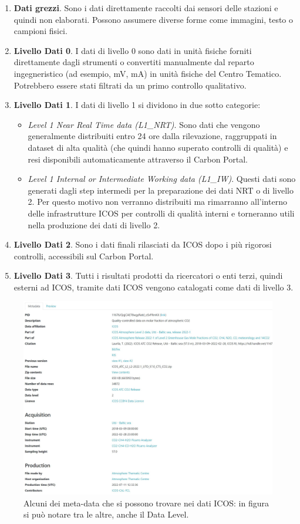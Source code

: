 \begin{enumerate}
    \item \textbf{Dati grezzi}. Sono i dati direttamente raccolti dai sensori delle stazioni e quindi non elaborati. Possono assumere diverse forme come immagini, testo o campioni fisici.
    \item \textbf{Livello Dati 0}. I dati di livello 0
    sono dati in unità fisiche forniti direttamente dagli
    strumenti o convertiti manualmente dal reparto
    ingegneristico (ad esempio, mV, mA) in unità fisiche
    del Centro Tematico. Potrebbero essere stati
    filtrati da un primo controllo qualitativo.
    \item \textbf{Livello Dati 1}. I dati di livello 1 si dividono in due sotto categorie:
        \begin{itemize}
            \item \textit{Level 1 Near Real Time data (L1\_NRT)}. Sono dati che 
            vengono generalmente distribuiti entro 24 ore dalla rilevazione,
            raggruppati in dataset di alta qualità (che quindi hanno superato
            controlli di qualità) e resi disponibili automaticamente attraverso
            il Carbon Portal.  
            \item \textit{Level 1 Internal or Intermediate Working data (L1\_IW)}.
            Questi dati sono generati dagli step intermedi per la preparazione dei dati
            NRT o di livello 2. Per questo motivo non verranno distribuiti ma rimarranno
            all'interno delle infrastrutture ICOS per controlli di qualità interni
            e torneranno utili nella produzione dei dati di livello 2.
        \end{itemize} 
    \item \textbf{Livello Dati 2}. Sono i dati finali rilasciati da ICOS dopo i più rigorosi
    controlli, accessibili sul Carbon Portal.
    \item \textbf{Livello Dati 3}. Tutti i risultati prodotti da ricercatori o enti
    terzi, quindi esterni ad ICOS, tramite dati ICOS vengono catalogati come dati di livello 3.
\end{enumerate}

\begin{figure}[h!]
    \centering
    \includegraphics[height=0.36\textwidth]{figures/metaEx.JPG}
    \caption{Alcuni dei meta-data che si possono trovare nei dati ICOS: in figura si può notare tra le altre, anche il Data Level.}
    \label{figure:metadata-ex}
\end{figure}